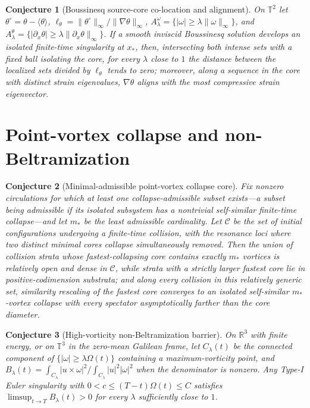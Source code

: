 \documentclass[11pt]{article}
\newtheorem{conjecture}{Conjecture}
\theoremstyle{definition}
\begin{document}
\begin{conjecture}[Boussinesq source-core co-location and alignment]\label{al13}
On $\mathbb T^2$ let $\theta^\circ=\theta-\langle\theta\rangle$, $\ell_\theta=\|\theta^\circ\|_\infty/\|\nabla\theta\|_\infty$, $A^\omega_\lambda=\{|\omega|\ge\lambda\|\omega\|_\infty\}$, and $A^\theta_\lambda=\{|\partial_x\theta|\ge\lambda\|\partial_x\theta\|_\infty\}$.  If a smooth inviscid Boussinesq solution develops an isolated finite-time singularity at $x_\ast$, then, intersecting both intense sets with a fixed ball isolating the core, for every $\lambda$ close to $1$ the distance between the localized sets divided by $\ell_\theta$ tends to zero; moreover, along a sequence in the core with distinct strain eigenvalues, $\nabla\theta$ aligns with the most compressive strain eigenvector.
\end{conjecture}

\section{Point-vortex collapse and non-Beltramization}

\begin{conjecture}[Minimal-admissible point-vortex collapse core]\label{al14}
Fix nonzero circulations for which at least one collapse-admissible subset exists---a subset being admissible if its isolated subsystem has a nontrivial self-similar finite-time collapse---and let $m_\ast$ be the least admissible cardinality.  Let $\mathcal C$ be the set of initial configurations undergoing a finite-time collision, with the resonance loci where two distinct minimal cores collapse simultaneously removed.  Then the union of collision strata whose fastest-collapsing core contains exactly $m_\ast$ vortices is relatively open and dense in $\mathcal C$, while strata with a strictly larger fastest core lie in positive-codimension substrata; and along every collision in this relatively generic set, similarity rescaling of the fastest core converges to an isolated self-similar $m_\ast$-vortex collapse with every spectator asymptotically farther than the core diameter.
\end{conjecture}

\begin{conjecture}[High-vorticity non-Beltramization barrier]\label{al15}
On $\mathbb R^3$ with finite energy, or on $\mathbb T^3$ in the zero-mean Galilean frame, let $C_\lambda(t)$ be the connected component of $\{|\omega|\ge\lambda\Omega(t)\}$ containing a maximum-vorticity point, and $B_\lambda(t)=\int_{C_\lambda}|u\times\omega|^2/\int_{C_\lambda}|u|^2|\omega|^2$ when the denominator is nonzero.  Any Type-I Euler singularity with $0<c\le(T-t)\Omega(t)\le C$ satisfies $\limsup_{t\to T}B_\lambda(t)>0$ for every $\lambda$ sufficiently close to $1$.
\end{conjecture}
\end{document}
